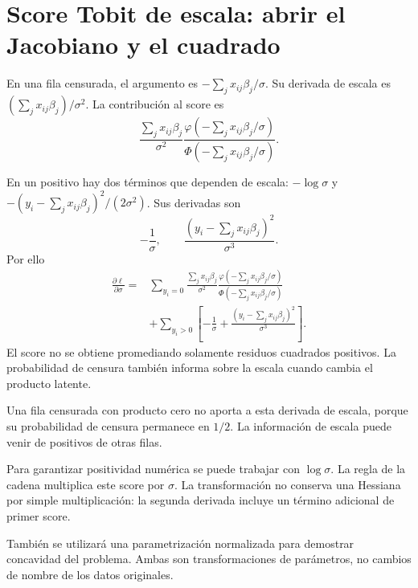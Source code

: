 \documentclass[11pt,a4paper]{article}
\begin{document}
\clearpage
\section{Score Tobit de escala: abrir el Jacobiano y el cuadrado}\label{unidad94}
En una fila censurada, el argumento
es \(-\sum_jx_{ij}\beta_j/\sigma\).
Su derivada de escala es
\((\sum_jx_{ij}\beta_j)/\sigma^2\).
La contribución al score es
\[
\frac{\sum_jx_{ij}\beta_j}{\sigma^2}
\frac{\varphi(-\sum_jx_{ij}\beta_j/\sigma)}
{\Phi(-\sum_jx_{ij}\beta_j/\sigma)}.
\]

En un positivo hay dos términos
que dependen de escala:
\(-\log\sigma\) y
\(-(y_i-\sum_jx_{ij}\beta_j)^2/(2\sigma^2)\).
Sus derivadas son
\[
-\frac1\sigma,\qquad
\frac{(y_i-\sum_jx_{ij}\beta_j)^2}{\sigma^3}.
\]
Por ello
\[
\begin{aligned}
\frac{\partial\ell}{\partial\sigma}
={}&\sum_{y_i=0}
\frac{\sum_jx_{ij}\beta_j}{\sigma^2}
\frac{\varphi(-\sum_jx_{ij}\beta_j/\sigma)}
{\Phi(-\sum_jx_{ij}\beta_j/\sigma)}\\
&+\sum_{y_i>0}
\left[-\frac1\sigma+
\frac{(y_i-\sum_jx_{ij}\beta_j)^2}{\sigma^3}\right].
\end{aligned}
\]
El score no se obtiene promediando
solamente residuos cuadrados positivos.
La probabilidad de censura
también informa sobre la escala
cuando cambia el producto latente.

\begin{ejemplo}
Una fila censurada con producto cero
no aporta a esta derivada de escala,
porque su probabilidad de censura
permanece en \(1/2\).
La información de escala puede venir
de positivos de otras filas.
\end{ejemplo}
Para garantizar positividad numérica
se puede trabajar con \(\log\sigma\).
La regla de la cadena multiplica
este score por \(\sigma\).
La transformación no conserva
una Hessiana por simple multiplicación:
la segunda derivada incluye
un término adicional de primer score.

También se utilizará una
parametrización normalizada para
demostrar concavidad del problema.
Ambas son transformaciones de
parámetros, no cambios de nombre
de los datos originales.

\clearpage
\end{document}
